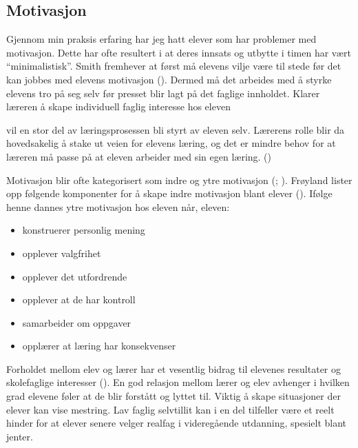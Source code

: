 \documentclass[main.tex]{subfiles}
\begin{document}
\subsection*{Motivasjon}

Gjennom min praksis erfaring har jeg hatt elever som har problemer med motivasjon. Dette har ofte resultert i at deres innsats og utbytte i timen har vært ``minimalistisk''. Smith fremhever at først må elevens vilje være til stede før det kan jobbes med elevens motivasjon (). Dermed må det arbeides med å styrke elevens tro på seg selv før presset blir lagt på det faglige innholdet. Klarer læreren å skape individuell faglig interesse hos eleven 
\begin{displayquote}
\textelp{} vil en stor del av læringsprosessen bli styrt av eleven selv. Lærerens rolle blir da hovedsakelig å stake ut veien for elevens læring, og det er mindre behov for at læreren må passe på at eleven arbeider med sin egen læring. \newline ()
\end{displayquote} 
Motivasjon blir ofte kategorisert som indre og ytre motivasjon (; ). Frøyland lister opp følgende komponenter for å skape indre motivasjon blant elever (). Ifølge henne dannes ytre motivasjon hos eleven når, eleven:
\begin{itemize}
\item konstruerer personlig mening  
\item opplever valgfrihet
\item opplever det utfordrende
\item opplever at de har kontroll
\item samarbeider om oppgaver
\item opplærer at læring har konsekvenser
\end{itemize}
Forholdet mellom elev og lærer har et vesentlig bidrag til elevenes resultater og skolefaglige interesser (). En god relasjon mellom lærer og elev avhenger i hvilken grad elevene føler at de blir forstått og lyttet til. 
Viktig å skape situasjoner der elever kan vise mestring. Lav faglig selvtillit kan i en del tilfeller være et reelt hinder for at elever senere velger realfag i videregående utdanning, spesielt blant jenter.
\end{document}
